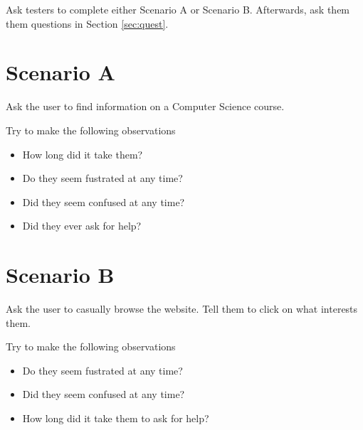 \documentclass[11pt]{article} %
\begin{document}
Ask testers to complete either Scenario A or Scenario B. Afterwards, ask them them questions in Section \ref{sec:quest}.
\section{Scenario A}
Ask the user to find information on a Computer Science course.

Try to make the following observations
\begin{itemize}
    \item How long did it take them?
    \item Do they seem fustrated at any time?
    \item Did they seem confused at any time?
    \item Did they ever ask for help?
\end{itemize}
\section{Scenario B}
Ask the user to casually browse the website. Tell them to click on what interests them.

Try to make the following observations
\begin{itemize}
    \item Do they seem fustrated at any time?
    \item Did they seem confused at any time?
    \item How long did it take them to ask for help?
\end{itemize}
\newpage
\end{document}
